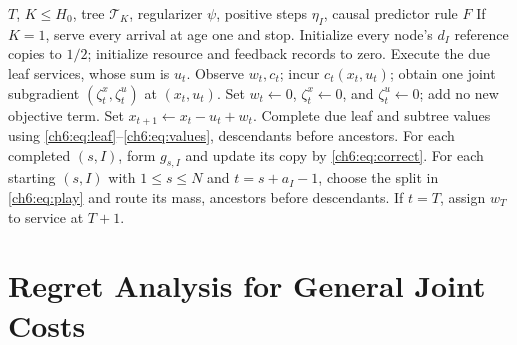\documentclass[11pt]{article}
\theoremstyle{plain}
\theoremstyle{remark}
\numberwithin{equation}{section}
\begin{document}
\begin{algorithm}[tb]
\caption{Deadline allocation with joint costs}
\label{ch6:alg:controller}
\begin{algorithmic}[1]
\Require $T$, $K\le H_0$, tree $\mathcal{T}_K$, regularizer $\psi$, positive
 steps $\eta_I$, causal predictor rule $F$
\State If $K=1$, serve every arrival at age one and stop.
\State Initialize every node's $d_I$ reference copies to $1/2$;
 initialize resource and feedback records to zero.
 \State Execute the due leaf services, whose sum is $u_t$.
  \State Observe $w_t,c_t$; incur $c_t(x_t,u_t)$; obtain one joint
  subgradient $(\zeta_t^x,\zeta_t^u)$ at $(x_t,u_t)$.
 \Else
  \State Set $w_t\gets0$, $\zeta_t^x\gets0$, and $\zeta_t^u\gets0$; add no new objective term.
 \EndIf
 \State Set $x_{t+1}\gets x_t-u_t+w_t$.
 \State Complete due leaf and subtree values using \eqref{ch6:eq:leaf}--\eqref{ch6:eq:values},
 descendants before ancestors.
 \State For each completed $(s,I)$, form $g_{s,I}$ and update its copy
 by \eqref{ch6:eq:correct}.
 \State For each starting $(s,I)$ with $1\le s\le N$ and
 $t=s+a_I-1$, choose the split in \eqref{ch6:eq:play} and route its mass,
 ancestors before descendants.
 \State If $t=T$, assign $w_T$ to service at $T+1$.
\EndFor
\end{algorithmic}
\end{algorithm}

\section{Regret Analysis for General Joint Costs}
\label{ch6:sec:analysis}
\end{document}
